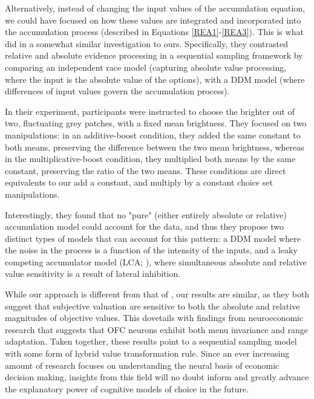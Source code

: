 \documentclass[11pt,a4paper]{article}
\begin{document}
 Alternatively, instead of changing the input values of the accumulation equation, we could have focused on how these values are integrated and incorporated into the accumulation process (described in Equations \ref{REA1}-\ref{REA3}). This is what  did in a somewhat similar investigation to ours. Specifically, they contrasted relative and absolute evidence processing in a sequential sampling framework by comparing an independent race model (capturing absolute value processing, where the input is the absolute value of the options), with a DDM model (where differences of input values govern the accumulation process).

In their experiment, participants were instructed to choose the brighter out of two, fluctuating grey patches, with a fixed mean brightness. They focused on two manipulations: in an additive-boost condition, they added the same constant to both means, preserving the difference between the two mean brightness, whereas in the multiplicative-boost condition, they multiplied both means by the same constant, preserving the ratio of the two means. These conditions are direct equivalents to our add a constant, and multiply by a constant choice set manipulations.

Interestingly, they found that no "pure" (either entirely absolute or relative) accumulation model could account for the data, and thus they propose two distinct types  of models that can account for this pattern: a DDM model where the noise in the process is a function of the intensity of the inputs, and a leaky competing accumulator model (LCA; ), where simultaneous absolute and relative value sensitivity is a result of lateral inhibition. 

While our approach is different from that of , our results are similar, as they both suggest that subjective valuation are sensitive to both the absolute and relative magnitudes of objective values. This dovetails with findings from neuroeconomic research that suggests that OFC neurons exhibit both menu invariance and range adaptation. Taken together, these results point to a sequential sampling model with some form of hybrid value transformation rule. Since an ever increasing amount of research focuses on understanding the neural basis of economic decision making, insights from this field will no doubt inform and greatly advance the explanatory power of cognitive models of choice in the future.



\newpage


\end{document}
